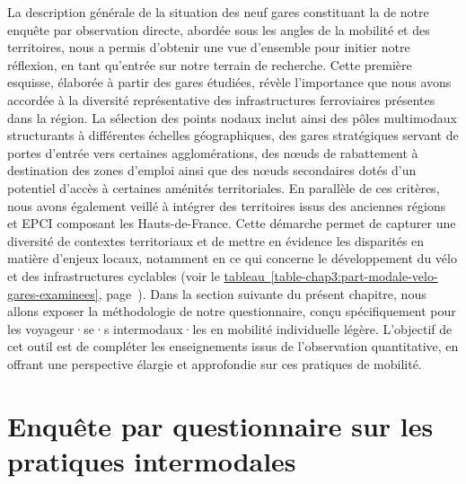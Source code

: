 \begin{refsegment}
La description générale de la situation des neuf gares constituant la  de notre enquête par observation directe, abordée sous les angles de la mobilité et des territoires, nous a permis d’obtenir une vue d’ensemble pour initier notre réflexion, en tant qu'entrée sur notre terrain de recherche. Cette première esquisse, élaborée à partir des gares étudiées, révèle l'importance que nous avons accordée à la diversité représentative des infrastructures ferroviaires présentes dans la région. La sélection des points nodaux inclut ainsi des pôles multimodaux structurants à différentes échelles géographiques, des gares stratégiques servant de portes d'entrée vers certaines agglomérations, des nœuds de rabattement à destination des zones d'emploi ainsi que des nœuds secondaires dotés d'un potentiel d'accès à certaines aménités territoriales. En parallèle de ces critères, nous avons également veillé à intégrer des territoires issus des anciennes régions et \acrshort{EPCI} composant les Hauts-de-France. Cette démarche permet de capturer une diversité de contextes territoriaux et de mettre en évidence les disparités en matière d’enjeux locaux, notamment en ce qui concerne le développement du vélo et des infrastructures cyclables (voir le \hyperref[table-chap3:part-modale-velo-gares-examinees]{tableau~\ref{table-chap3:part-modale-velo-gares-examinees}}, page~\pageref{table-chap3:part-modale-velo-gares-examinees}). Dans la section suivante du présent chapitre, nous allons exposer la méthodologie de notre questionnaire, conçu spécifiquement pour les voyageur·se·s intermodaux·les en mobilité individuelle légère. L’objectif de cet outil est de compléter les enseignements issus de l’observation quantitative, en offrant une perspective élargie et approfondie sur ces pratiques de mobilité.%

    \newpage
\section{Enquête par questionnaire sur les pratiques intermodales
    \label{chap3:questionnaire}
    }


\end{refsegment}
